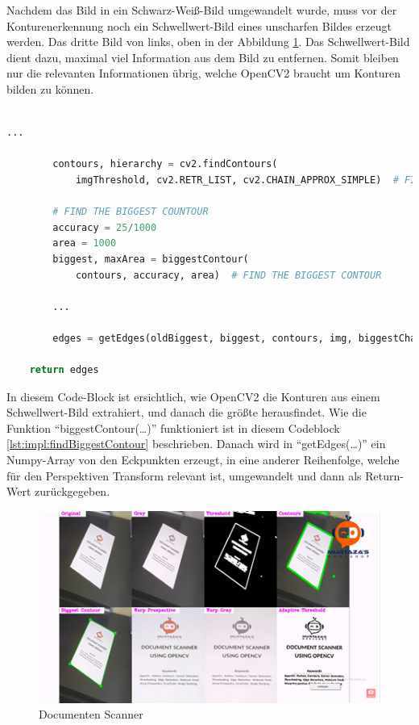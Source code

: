 Nachdem das Bild in ein Schwarz-Weiß-Bild umgewandelt wurde, muss vor der Konturenerkennung noch ein Schwellwert-Bild eines unscharfen Bildes erzeugt werden.
Das dritte Bild von links, oben in der Abbildung \ref{fig:map:documentscanner}. Das Schwellwert-Bild dient dazu, maximal viel Information aus dem Bild zu entfernen. Somit bleiben nur die relevanten Informationen übrig, welche OpenCV2 braucht um Konturen bilden zu können.\\
\\
\begin{lstlisting}[caption=Erhalten von Konturen,language=Python,label=lst:impl:getContours]
        ...

        contours, hierarchy = cv2.findContours(
            imgThreshold, cv2.RETR_LIST, cv2.CHAIN_APPROX_SIMPLE)  # FIND ALL CONTOURS

        # FIND THE BIGGEST COUNTOUR
        accuracy = 25/1000
        area = 1000
        biggest, maxArea = biggestContour(
            contours, accuracy, area)  # FIND THE BIGGEST CONTOUR

        ...

        edges = getEdges(oldBiggest, biggest, contours, img, biggestChanged)

    return edges
\end{lstlisting}

In diesem Code-Block ist ersichtlich, wie OpenCV2 die Konturen aus einem Schwellwert-Bild extrahiert,
und danach die größte herausfindet.
Wie die Funktion ``biggestContour(\dots)'' funktioniert ist in diesem Codeblock \ref{lst:impl:findBiggestContour} beschrieben. Danach wird in ``getEdges(\dots)'' ein Numpy-Array von den Eckpunkten erzeugt, in eine anderer Reihenfolge, welche für den Perspektiven Transform relevant ist, umgewandelt und dann als Return-Wert zurückgegeben.

\begin{figure}[H]
  \centering
  \includegraphics[scale=1]{pics/maperkennung/documentscanner.png}
  \caption{Documenten Scanner \cite{maai:documentscannerYoutube:cite}}
  \label{fig:map:documentscanner}
\end{figure}

